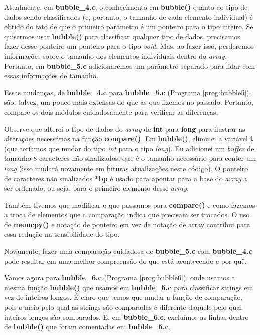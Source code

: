 Atualmente, em \textbf{bubble\_4.c}, o conhecimento em \textbf{bubble()} quanto ao tipo de dados sendo classificados (e, portanto, o tamanho de cada elemento individual) é obtido do fato de que o primeiro parâmetro é um ponteiro para o tipo inteiro. Se quisermos usar \textbf{bubble()} para classificar qualquer tipo de dados, precisamos fazer desse ponteiro um ponteiro para o tipo \textit{void}. Mas, ao fazer isso, perderemos informações sobre o tamanho dos elementos individuais dentro do \textit{array}. Portanto, em \textbf{bubble\_5.c} adicionaremos um parâmetro separado para lidar com essas informações de tamanho.

Essas mudanças, de \textbf{bubble\_4.c} para \textbf{bubble\_5.c} (Programa \ref{prog:bubble5}), são, talvez, um pouco mais extensas do que as que fizemos no passado. Portanto, compare os dois módulos cuidadosamente para verificar as diferenças.



Observe que alterei o tipo de dados do \textit{array} de \textbf{int} para \textbf{long} para ilustrar as alterações necessárias na função \textbf{compare()}. Em \textbf{bubble()}, eliminei a variável \textbf{t} (que teríamos que mudar do tipo \textit{int} para o tipo \textit{long}). Eu adicionei um \textit{buffer} de tamanho 8 caracteres não sinalizados, que é o tamanho necessário para conter um \textit{long} (isso mudará novamente em futuras atualizações neste código). O ponteiro de caracteres não sinalizados \textbf{*bp} é usado para apontar para a base do \textit{array} a ser ordenado, ou seja, para o primeiro elemento desse \textit{array}.

Também tivemos que modificar o que passamos para \textbf{compare()} e como fazemos a troca de elementos que a comparação indica que precisam ser trocados. O uso de \textbf{memcpy()} e notação de ponteiro em vez de notação de array contribui para essa redução na sensibilidade do tipo.

Novamente, fazer uma comparação cuidadosa de \textbf{bubble\_5.c} com \textbf{bubble\_4.c} pode resultar em uma melhor compreensão do que está acontecendo e por quê.

Vamos agora para \textbf{bubble\_6.c} (Programa \ref{prog:bubble6}), onde usamos a mesma função \textbf{bubble()} que usamos em \textbf{bubble\_5.c} para classificar strings em vez de inteiros longos. É claro que temos que mudar a função de comparação, pois o meio pelo qual as strings são comparadas é diferente daquele pelo qual inteiros longos são comparados. E, em \textbf{bubble\_6.c}, excluímos as linhas dentro de \textbf{bubble()} que foram comentadas em \textbf{bubble\_5.c}.

